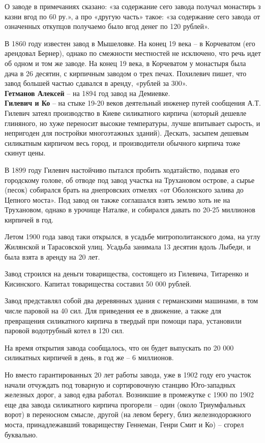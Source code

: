 О заводе в примечаниях сказано: «за содержание сего завода получал монастирь з казни вгод по 60 ру.», а про «другую часть» такое: «за содержание сего завода от означенных откупцов получаемо было вгод денег по 120 рублей». 

В 1860 году известен завод в Мышеловке. На конец 19 века – в Корчеватом (его арендовал Бернер), однако по смежности местностей не исключено, что речь идет об одном и том же заводе. На конец 19 века, в Корчеватом у монастыря была дача в 26 десятин, с кирпичным заводом о трех печах. Похилевич пишет, что завод большей частью сдавался в аренду, «рублей за 300».\\

\noindent\textbf{Гетманов Алексей} – на 1894 год завод на Демиевке.\\

\noindent\textbf{Гилевич и Ко} – на стыке 19-20 веков деятельный инженер путей сообщения А.Т. Гилевич затеял производство в Киеве силикатного кирпича (который дешевле глиняного, но хуже переносит высокие температуры, лучше впитывает сырость, и непригоден для постройки многоэтажных зданий). Дескать, засыпем дешевым силикатным кирпичом весь город, и производители обычного кирпича тоже скинут цены.

В 1899 году Гилевич настойчиво пытался пробить ходатайство, подавая его городскому голове, об отводе под завод участка на Трухановом острове, а сырье (песок) собирался брать на днепровских отмелях «от Оболонского залива до Цепного моста». Под завод он также соглашался взять землю хоть не на Трухановом, однако в урочище Наталке, и собирался давать по 20-25 миллионов кирпичей в год.

Летом 1900 года завод таки открылся, в усадьбе митрополитанского дома, на углу Жилянской и Тарасовской улиц. Усадьба занимала 13 десятин вдоль Лыбеди, и была взята в аренду на 20 лет.

Завод строился на деньги товарищества, состоящего из Гилевича, Титаренко и Кисинского. Капитал товарищества составил 50 000 рублей. 

Завод представлял собой два деревянных здания с германскими машинами, в том числе паровой на 40 сил. Для приведения ее в движение, а также для превращения силикатного кирпича в твердый при помощи пара, установили паровой водотрубный котел в 120 сил.

На время открытия завода сообщалось, что он будет выпускать по 20 000 силикатных кирпичей в день, в год же – 6 миллионов.

Но вместо гарантированных 20 лет работы завода, уже в 1902 году его участок начали отчуждать под товарную и сортировочную станцию Юго-западных железных дорог, а завод едва работал. Возникшие в промежутке с 1900 по 1902 еще два завода силикатного кирпича прогорели – один (около Триумфальных ворот) в переносном смысле, другой (на левом берегу, близ железнодорожного моста, принадлежавший товариществу Геннеман, Генри Смит и Ко) – сгорел буквально.\\


